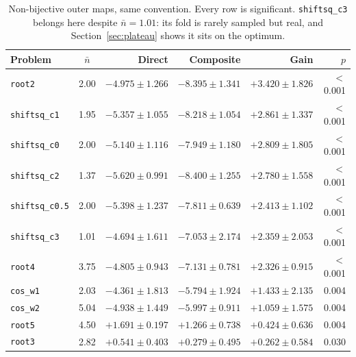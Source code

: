 \begin{table}[H]
\centering
\small
\caption{Non-bijective outer maps, same convention. Every row is significant. \texttt{shiftsq\_c3} belongs here despite $\bar n=1.01$: its fold is rarely sampled but real, and Section~\ref{sec:plateau} shows it sits on the optimum.}
\label{tab:nonbij}
\begin{tabular}{l c r r r r}
\toprule
Problem & $\bar n$ & Direct & Composite & Gain & $p$ \\
\midrule
\texttt{root2} & 2.00 & $-4.975\pm1.266$ & $-8.395\pm1.341$ & $\mathbf{+3.420}\pm1.826$ & $<$0.001 \\
\texttt{shiftsq\_c1} & 1.95 & $-5.357\pm1.055$ & $-8.218\pm1.054$ & $\mathbf{+2.861}\pm1.337$ & $<$0.001 \\
\texttt{shiftsq\_c0} & 2.00 & $-5.140\pm1.116$ & $-7.949\pm1.180$ & $\mathbf{+2.809}\pm1.805$ & $<$0.001 \\
\texttt{shiftsq\_c2} & 1.37 & $-5.620\pm0.991$ & $-8.400\pm1.255$ & $\mathbf{+2.780}\pm1.558$ & $<$0.001 \\
\texttt{shiftsq\_c0.5} & 2.00 & $-5.398\pm1.237$ & $-7.811\pm0.639$ & $\mathbf{+2.413}\pm1.102$ & $<$0.001 \\
\texttt{shiftsq\_c3} & 1.01 & $-4.694\pm1.611$ & $-7.053\pm2.174$ & $\mathbf{+2.359}\pm2.053$ & $<$0.001 \\
\texttt{root4} & 3.75 & $-4.805\pm0.943$ & $-7.131\pm0.781$ & $\mathbf{+2.326}\pm0.915$ & $<$0.001 \\
\texttt{cos\_w1} & 2.03 & $-4.361\pm1.813$ & $-5.794\pm1.924$ & $\mathbf{+1.433}\pm2.135$ & 0.004 \\
\texttt{cos\_w2} & 5.04 & $-4.938\pm1.449$ & $-5.997\pm0.911$ & $\mathbf{+1.059}\pm1.575$ & 0.004 \\
\texttt{root5} & 4.50 & $+1.691\pm0.197$ & $+1.266\pm0.738$ & $\mathbf{+0.424}\pm0.636$ & 0.004 \\
\texttt{root3} & 2.82 & $+0.541\pm0.403$ & $+0.279\pm0.495$ & $\mathbf{+0.262}\pm0.584$ & 0.030 \\
\bottomrule
\end{tabular}
\end{table}
